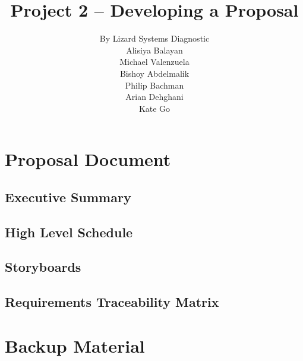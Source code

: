 \documentclass{article}
\title{Project 2 – Developing a Proposal}
\author{
By Lizard Systems Diagnostic\\
Alisiya Balayan\\
Michael Valenzuela\\
Bishoy Abdelmalik\\
Philip Bachman\\
Arian Dehghani\\
Kate Go
}
\begin{document}
\maketitle
\tableofcontents

\section{Proposal Document}
\subsection{Executive Summary}
\subsection{High Level Schedule}
\subsection{Storyboards}
\subsection{Requirements Traceability Matrix}
\section{Backup Material}
\end{document}
